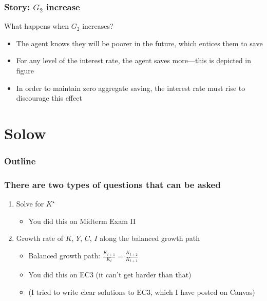 \documentclass[presentation,dvipsnames]{beamer}
\begin{document}
\begin{frame}
\frametitle{Story: $G_{2}$ increase}
What happens when $G_{2}$ increases?
\begin{itemize}[label={--}]
\item The agent knows they will be poorer in the future, which entices them to save
\item For any level of the interest rate, the agent saves more---this is depicted in figure
\item In order to maintain zero aggregate saving, the interest rate must rise to discourage this effect
\end{itemize}
\end{frame}

\label{sec-3}
\section{Solow}

\begin{frame}
\frametitle{Outline}
\tableofcontents[currentsection]
\end{frame}

\begin{frame}
\frametitle{There are two types of questions that can be asked}

\begin{enumerate}[label=(\roman*)]
\item\label{item:3} Solve for $K^{\star}$
\begin{itemize}[label={--}]
\item You did this on Midterm Exam II
\end{itemize}
\item Growth rate of $K$, $Y$, $C$, $I$ along the balanced growth path
\begin{itemize}[label={--}]
\item Balanced growth path: $\frac{K_{t+1}}{K_{t}} = \frac{K_{t+2}}{K_{t+1}}$
\item You did this on EC3 (it can't get harder than that)
\item (I tried to write clear solutions to EC3, which I have posted on Canvas)
\end{itemize}
\end{enumerate}


\end{frame}
\end{document}
